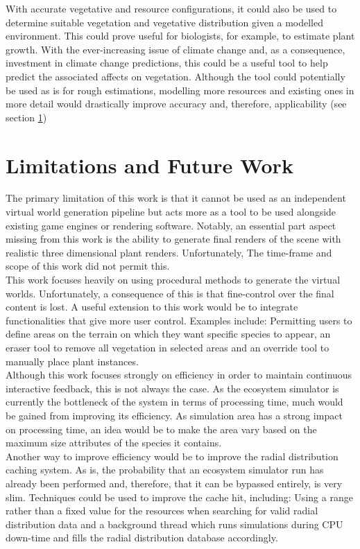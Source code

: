With accurate vegetative and resource configurations, it could also be used to determine suitable vegetation and vegetative distribution given a modelled environment. This could prove useful for biologists, for example, to estimate plant growth. With the ever-increasing issue of climate change and, as a consequence, investment in climate change predictions, this could be a useful tool to help predict the associated affects on vegetation. Although the tool could potentially be used as is for rough estimations, modelling more resources and existing ones in more detail would drastically improve accuracy and, therefore, applicability (see section \ref{sec:future_work})\\

\section{Limitations and Future Work} \label{sec:future_work}

The primary limitation of this work is that it cannot be used as an independent virtual world generation pipeline but acts more as a tool to be used alongside existing game engines or rendering software. Notably, an essential part aspect missing from this work is the ability to generate final renders of the scene with realistic three dimensional plant renders. Unfortunately, The time-frame and scope of this work did not permit this.\\

This work focuses heavily on using procedural methods to generate the virtual worlds. Unfortunately, a consequence of this is that fine-control over the final content is lost. A useful extension to this work would be to integrate functionalities that give more user control. Examples include: Permitting users to define areas on the terrain on which they want specific species to appear, an eraser tool to remove all vegetation in selected areas and an override tool to manually place plant instances.\\

Although this work focuses strongly on efficiency in order to maintain continuous interactive feedback, this is not always the case. As the ecosystem simulator is currently the bottleneck of the system in terms of processing time, much would be gained from improving its efficiency. As simulation area has a strong impact on processing time, an idea would be to make the area vary based on the maximum size attributes of the species it contains. \\
Another way to improve efficiency would be to improve the radial distribution caching system. As is, the probability that an ecosystem simulator run has already been performed and, therefore, that it can be bypassed entirely, is very slim. Techniques could be used to improve the cache hit, including: Using a range rather than a fixed value for the resources when searching for valid radial distribution data and a background thread which runs simulations during CPU down-time and fills the radial distribution database accordingly.\\

